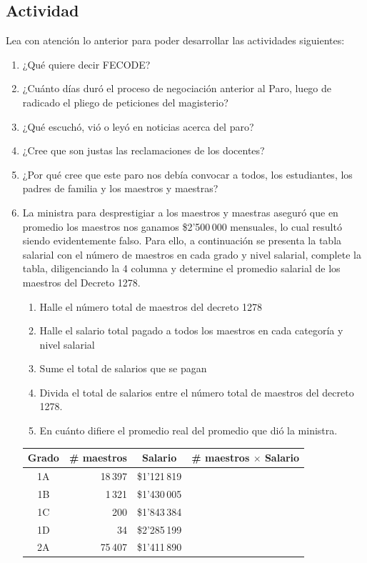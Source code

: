 \documentclass[letterpaper,11pt,twoside]{article}
\begin{document}
\begin{multicols}{2}
\section*{Actividad}
Lea con atención lo anterior para poder desarrollar las actividades siguientes:
\begin{enumerate}
\item ¿Qué quiere decir FECODE?
\item ¿Cuánto días duró el proceso de negociación anterior al Paro, luego de radicado el pliego de peticiones del magisterio?
\item ¿Qué escuchó, vió o leyó en noticias acerca del paro?
\item ¿Cree que son justas las reclamaciones de los docentes?
\item ¿Por qué cree que este paro nos debía convocar a todos, los estudiantes, los padres de familia y los maestros y maestras?
\item La ministra para desprestigiar a los maestros y maestras aseguró que en promedio los maestros nos ganamos \$2'500\,000 mensuales, lo cual resultó siendo evidentemente falso. Para ello, a continuación se presenta la tabla salarial con el número de maestros en cada grado y nivel salarial, complete la tabla, diligenciando la 4 columna y determine el promedio salarial de los maestros del Decreto 1278.
\begin{enumerate}
\item Halle el número total de maestros del decreto 1278
\item Halle el salario total pagado a todos los maestros en cada categoría y nivel salarial
\item Sume el total de salarios que se pagan 
\item Divida el total de salarios entre el número total de maestros del decreto 1278.
\item En cuánto difiere el promedio real del promedio que dió la ministra.
\end{enumerate}
\begin{tabular}{|c|r|c|p{2cm}|}
\hline 
Grado & \# maestros & Salario  & \# maestros $\times$ Salario \\ 
\hline 
1A & 18\,397 & \$1'121\,819 &  \\ 
\hline 
1B & 1\,321 & \$1'430\,005 &  \\ 
\hline 
1C & 200 & \$1'843\,384 &  \\ 
\hline 
1D & 34 & \$2'285\,199 &  \\ 
\hline 
2A & 75\,407 & \$1'411\,890 &  \\ 

\end{tabular}
\end{enumerate}
\end{multicols}
\end{document}
